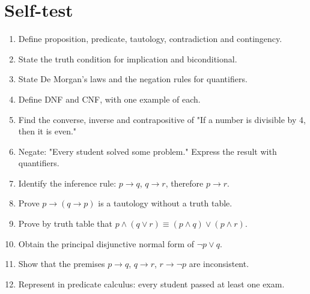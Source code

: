 \documentclass[11pt,a4paper]{article}
\begin{document}
\section{Self-test}

\begin{enumerate}
\item Define proposition, predicate, tautology, contradiction and contingency.
\item State the truth condition for implication and biconditional.
\item State De Morgan's laws and the negation rules for quantifiers.
\item Define DNF and CNF, with one example of each.
\item Find the converse, inverse and contrapositive of "If a number is divisible by 4, then it is even."
\item Negate: "Every student solved some problem." Express the result with quantifiers.
\item Identify the inference rule: $p\to q$, $q\to r$, therefore $p\to r$.
\item Prove $p\to(q\to p)$ is a tautology without a truth table.
\item Prove by truth table that $p\land(q\lor r)\equiv(p\land q)\lor(p\land r)$.
\item Obtain the principal disjunctive normal form of $\neg p\lor q$.
\item Show that the premises $p\to q$, $q\to r$, $r\to\neg p$ are inconsistent.
\item Represent in predicate calculus: every student passed at least one exam.
\end{enumerate}
\end{document}
